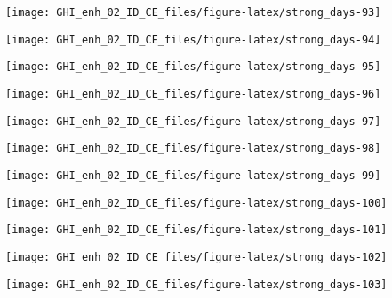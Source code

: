 \documentclass[
  10pt,
  a4paper,oneside]{article}
\begin{document}
\begin{center}\texttt{[image: GHI\_enh\_02\_ID\_CE\_files/figure-latex/strong\_days-93]} \end{center}

\begin{center}\texttt{[image: GHI\_enh\_02\_ID\_CE\_files/figure-latex/strong\_days-94]} \end{center}

\begin{center}\texttt{[image: GHI\_enh\_02\_ID\_CE\_files/figure-latex/strong\_days-95]} \end{center}

\begin{center}\texttt{[image: GHI\_enh\_02\_ID\_CE\_files/figure-latex/strong\_days-96]} \end{center}

\begin{center}\texttt{[image: GHI\_enh\_02\_ID\_CE\_files/figure-latex/strong\_days-97]} \end{center}

\begin{center}\texttt{[image: GHI\_enh\_02\_ID\_CE\_files/figure-latex/strong\_days-98]} \end{center}

\begin{center}\texttt{[image: GHI\_enh\_02\_ID\_CE\_files/figure-latex/strong\_days-99]} \end{center}

\begin{center}\texttt{[image: GHI\_enh\_02\_ID\_CE\_files/figure-latex/strong\_days-100]} \end{center}

\begin{center}\texttt{[image: GHI\_enh\_02\_ID\_CE\_files/figure-latex/strong\_days-101]} \end{center}

\begin{center}\texttt{[image: GHI\_enh\_02\_ID\_CE\_files/figure-latex/strong\_days-102]} \end{center}

\begin{center}\texttt{[image: GHI\_enh\_02\_ID\_CE\_files/figure-latex/strong\_days-103]} \end{center}
\end{document}

